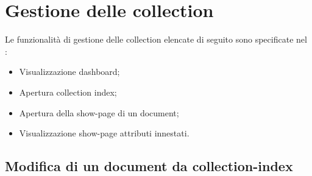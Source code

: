 \clearpage
\section{Gestione delle collection}
Le funzionalità di gestione delle collection elencate di seguito sono specificate nel \ManualeUtente{}:
	\begin{itemize}
		\item Visualizzazione dashboard;
		\item Apertura collection index;
		\item Apertura della show-page di un document;
		\item Visualizzazione show-page attributi innestati.
	\end{itemize}
	

	\subsection{Modifica di un document da collection-index} %
	\label{modificadocumentdacollectionindex}
